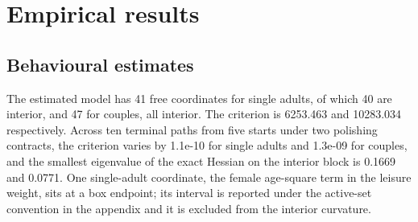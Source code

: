 \section{Empirical results}\label{empirical-results}

\subsection{Behavioural estimates}\label{behavioural-estimates}

The estimated model has 41 free coordinates for single adults, of which 40 are interior, and 47 for couples, all interior. The criterion is 6253.463 and 10283.034 respectively. Across ten terminal paths from five starts under two polishing contracts, the criterion varies by 1.1e-10 for single adults and 1.3e-09 for couples, and the smallest eigenvalue of the exact Hessian on the interior block is 0.1669 and 0.0771. One single-adult coordinate, the female age-square term in the leisure weight, sits at a box endpoint; its interval is reported under the active-set convention in the appendix and it is excluded from the interior curvature.

